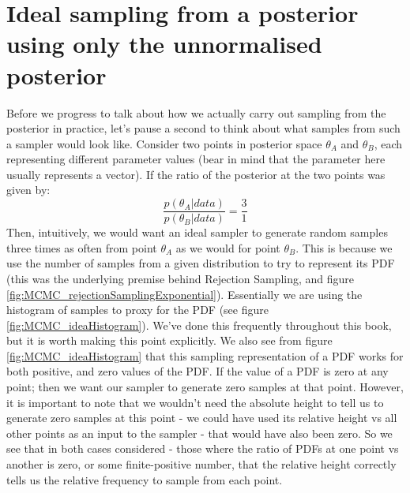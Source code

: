 \documentclass[11pt,fullpage]{book}
\begin{document}
\section{Ideal sampling from a posterior using only the unnormalised posterior}\label{sec:MCMC_idealSampling}
Before we progress to talk about how we actually carry out sampling from the posterior in practice, let's pause a second to think about what samples from such a sampler would look like. Consider two points in posterior space $\theta_A$ and $\theta_B$, each representing different parameter values (bear in mind that the parameter here usually represents a vector). If the ratio of the posterior at the two points was given by:
%
\begin{equation}
\frac{p(\theta_A|data)}{p(\theta_B|data)} = \frac{3}{1}
\end{equation}
%
Then, intuitively, we would want an ideal sampler to generate random samples three times as often from point $\theta_A$ as we would for point $\theta_B$. This is because we use the number of samples from a given distribution to try to represent its PDF (this was the underlying premise behind Rejection Sampling, and figure \ref{fig:MCMC_rejectionSamplingExponential}). Essentially we are using the histogram of samples to proxy for the PDF (see figure \ref{fig:MCMC_ideaHistogram}). We've done this frequently throughout this book, but it is worth making this point explicitly. We also see from figure \ref{fig:MCMC_ideaHistogram} that this sampling representation of a PDF works for both positive, and zero values of the PDF. If the value of a PDF is zero at any point; then we want our sampler to generate zero samples at that point. However, it is important to note that we wouldn't need the absolute height to tell us to generate zero samples at this point - we could have used its relative height vs all other points as an input to the sampler - that would have also been zero. So we see that in both cases considered - those where the ratio of PDFs at one point vs another is zero, or some finite-positive number, that the relative height correctly tells us the relative frequency to sample from each point. 
\end{document}
